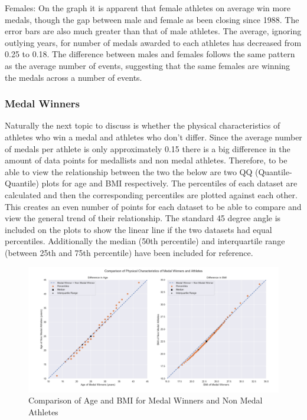 \documentclass[a4 paper, 12pt]{article}
\begin{document}
        Females: On the graph it is apparent that female athletes on average win more medals, though the gap between male and female as been closing since 1988. The error bars are also much greater than that of male athletes. The average, ignoring outlying years, for number of medals awarded to each athletes has decreased from 0.25 to 0.18. The difference between males and females follows the same pattern as the average number of events, suggesting that the same females are winning the medals across a number of events. 

        \subsubsection{Medal Winners}
        Naturally the next topic to discuss is whether the physical characteristics of athletes who win a medal and athletes who don't differ. Since the average number of medals per athlete is only approximately 0.15 there is a big difference in the amount of data points for medallists and non medal athletes. Therefore, to be able to view the relationship between the two the below are two QQ (Quantile-Quantile) plots for age and BMI respectively. The percentiles of each dataset are calculated and then the corresponding percentiles are plotted against each other. This creates an even number of points for each dataset to be able to compare and view the general trend of their relationship. The standard 45 degree angle is included on the plots to show the linear line if the two datasets had equal percentiles. Additionally the median (50th percentile) and interquartile range (between 25th and 75th percentile) have been included for reference.
        \begin{figure} [H]
            \centering
            \includegraphics[width=\textwidth, frame]
                {./images/graph/athlete_difference_qqplot.png}      
                \caption{Comparison of Age and BMI for Medal Winners and Non Medal Athletes} 
        \end{figure}
        
\end{document}
